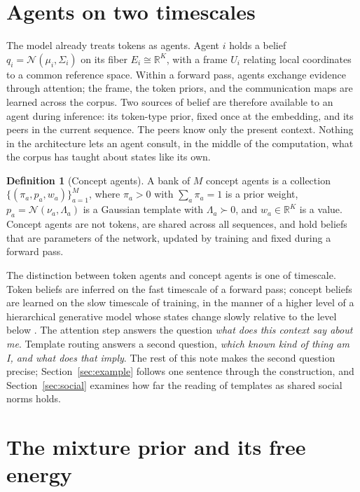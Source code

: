 \documentclass[11pt]{article}
\theoremstyle{definition}
\newtheorem{definition}{Definition}
\theoremstyle{remark}
\newcommand{\N}{\mathcal{N}}
\begin{document}
\section{Agents on two timescales}

The model already treats tokens as agents. Agent $i$ holds a belief $q_i=\N(\mu_i,\Sigma_i)$ on its fiber $E_i\cong\mathbb{R}^K$, with a frame $U_i$ relating local coordinates to a common reference space. Within a forward pass, agents exchange evidence through attention; the frame, the token priors, and the communication maps are learned across the corpus. Two sources of belief are therefore available to an agent during inference: its token-type prior, fixed once at the embedding, and its peers in the current sequence. The peers know only the present context. Nothing in the architecture lets an agent consult, in the middle of the computation, what the corpus has taught about states like its own.

\begin{definition}[Concept agents]
A bank of $M$ concept agents is a collection $\{(\pi_a,p_a,w_a)\}_{a=1}^M$, where $\pi_a>0$ with $\sum_a\pi_a=1$ is a prior weight, $p_a=\N(\nu_a,\Lambda_a)$ is a Gaussian template with $\Lambda_a\succ0$, and $w_a\in\mathbb{R}^K$ is a value. Concept agents are not tokens, are shared across all sequences, and hold beliefs that are parameters of the network, updated by training and fixed during a forward pass.
\end{definition}

The distinction between token agents and concept agents is one of timescale. Token beliefs are inferred on the fast timescale of a forward pass; concept beliefs are learned on the slow timescale of training, in the manner of a higher level of a hierarchical generative model whose states change slowly relative to the level below \citep{friston2008hierarchical}. The attention step answers the question \emph{what does this context say about me}. Template routing answers a second question, \emph{which known kind of thing am I, and what does that imply}. The rest of this note makes the second question precise; Section~\ref{sec:example} follows one sentence through the construction, and Section~\ref{sec:social} examines how far the reading of templates as shared social norms holds.

\section{The mixture prior and its free energy}
\end{document}
